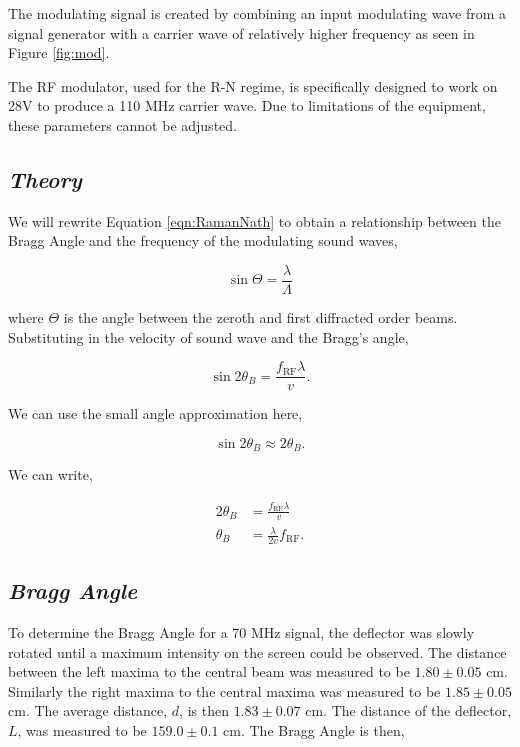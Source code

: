 \documentclass[aps,prl,reprint,10pt,amsmath,amssymb,superscriptaddress,a4paper]{revtex4-2}
\begin{document}
The modulating signal is created by combining an input modulating wave from a signal generator with a carrier wave of relatively higher 
frequency as seen in Figure \ref{fig:mod}.

The RF modulator, used for the R-N regime, is specifically designed to work on 28V to produce a 110 MHz carrier wave. Due to limitations of the equipment, these 
parameters cannot be adjusted.

\subsection{\normalfont\textit{Theory}}
We will rewrite Equation \ref{eqn:RamanNath} to obtain a relationship between the Bragg Angle and the frequency of the modulating 
sound waves,

\begin{equation*}
    \sin{\Theta} = \frac{\lambda}{\Lambda}
\end{equation*}

where $\Theta$ is the angle between the zeroth and first diffracted order beams. Substituting in the velocity of sound wave and the Bragg's angle,

\begin{equation*}
    \sin{2\theta_B} = \frac{f_{\text{RF}}\lambda}{v}.
\end{equation*}

We can use the small angle approximation here,

\begin{equation*}
    \sin{2\theta_B} \approx 2\theta_B.
\end{equation*}

We can write,

\begin{align}
    2\theta_B &= \frac{f_{\text{RF}}\lambda}{v} \\
    \theta_B &= \frac{\lambda}{2v}f_{\text{RF}}.
    \label{eqn:velocity}
\end{align}

\subsection{\normalfont\textit{Bragg Angle}}
To determine the Bragg Angle for a 70 MHz signal, the deflector was slowly rotated until a maximum intensity on the screen could be observed.
The distance between the left maxima to the central beam was measured to be $1.80 \pm 0.05$ cm. Similarly the right maxima 
to the central maxima was measured to be $1.85 \pm 0.05$ cm. The average distance, $d$, is then $1.83 \pm 0.07$ cm. The distance 
of the deflector, $L$, was measured to be $159.0 \pm 0.1$ cm. The Bragg Angle is then,
\end{document}
